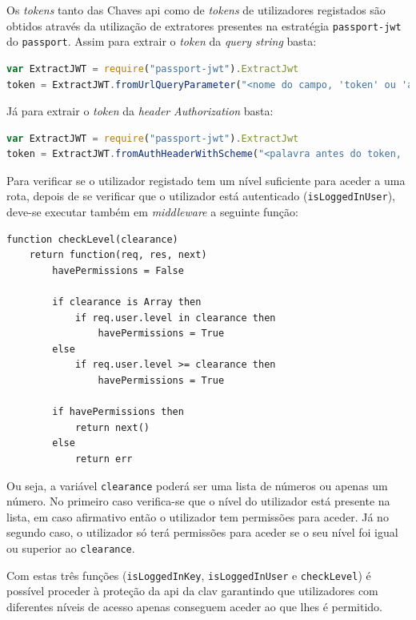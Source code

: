 Os \textit{tokens} tanto das Chaves \acrshort{api} como de \textit{tokens} de utilizadores registados são obtidos através da utilização de extratores presentes na estratégia \texttt{passport-jwt} do \texttt{passport}. Assim para extrair o \textit{token} da \textit{query string} basta:
\begin{lstlisting}[language=javascript, caption=Extração do \textit{token} da \textit{query string}]
var ExtractJWT = require("passport-jwt").ExtractJwt
token = ExtractJWT.fromUrlQueryParameter("<nome do campo, 'token' ou 'apikey' no caso da CLAV>")
\end{lstlisting}
Já para extrair o \textit{token} da \textit{header} \textit{Authorization} basta:
\begin{lstlisting}[language=javascript, caption=Extração do \textit{token} da \textit{heaer} \textit{Authorization}]
var ExtractJWT = require("passport-jwt").ExtractJwt
token = ExtractJWT.fromAuthHeaderWithScheme("<palavra antes do token, 'Bearer' no caso dum bearer token, 'token' ou 'apikey' no caso da CLAV>")
\end{lstlisting}

Para verificar se o utilizador registado tem um nível suficiente para aceder a uma rota, depois de se verificar que o utilizador está autenticado (\texttt{isLoggedInUser}), deve-se executar também em \textit{middleware} a seguinte função:
\begin{lstlisting}[language=pseudocode, caption=Verificação se um utilizador registado tem permissões suficientes para aceder a uma determinada rota]
function checkLevel(clearance)
    return function(req, res, next)
        havePermissions = False

        if clearance is Array then
            if req.user.level in clearance then
                havePermissions = True
        else
            if req.user.level >= clearance then
                havePermissions = True

        if havePermissions then
            return next()
        else
            return err
\end{lstlisting}
Ou seja, a variável \texttt{clearance} poderá ser uma lista de números ou apenas um número. No primeiro caso verifica-se que o nível do utilizador está presente na lista, em caso afirmativo então o utilizador tem permissões para aceder. Já no segundo caso, o utilizador só terá permissões para aceder se o seu nível foi igual ou superior ao \texttt{clearance}.

Com estas três funções (\texttt{isLoggedInKey}, \texttt{isLoggedInUser} e \texttt{checkLevel}) é possível proceder à proteção da \acrshort{api} da \acrshort{clav} garantindo que utilizadores com diferentes níveis de acesso apenas conseguem aceder ao que lhes é permitido.

